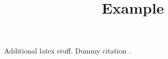 \documentclass[11pt,a4paper]{article}
\begin{document}
\title{Example}
\maketitle

Additional latex stuff. Dummy citation \cite{LNCS2283}.





\end{document}

